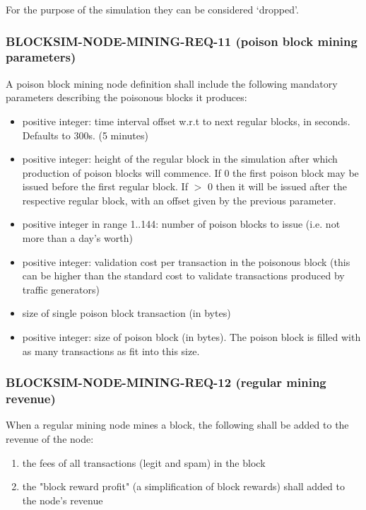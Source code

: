 \documentclass{scrreprt}
\begin{document}
        For the purpose of the simulation they can be considered `dropped'.

      \subsubsection{BLOCKSIM-NODE-MINING-REQ-11 (poison block mining parameters)}

        A poison block mining node definition shall include the following
        mandatory parameters describing the poisonous blocks it produces:

        \begin{itemize}
          \item positive integer: time interval offset w.r.t to next regular
            blocks, in seconds.  Defaults to 300s.  (5 minutes)
          \item positive integer: height of the regular block in the simulation
            after which production of poison blocks will commence.
            If 0 the first poison block may be issued before the first regular block.
            If $>$ 0 then it will be issued after the respective regular block, with an offset
            given by the previous parameter.
          \item positive integer in range 1..144: number of poison blocks to
            issue (i.e. not more than a day's worth)
          \item positive integer: validation cost per transaction in the
            poisonous block (this can be higher than the standard cost to validate
            transactions produced by traffic generators)
          \item size of single poison block transaction (in bytes)
          \item positive integer: size of poison block (in bytes).
            The poison block is filled with as many transactions as fit into
            this size.
        \end{itemize}

      \subsubsection{BLOCKSIM-NODE-MINING-REQ-12 (regular mining revenue)}

        When a regular mining node mines a block, the following shall be
        added to the revenue of the node:

        \begin{enumerate}
          \item the fees of all transactions (legit and spam) in the block
          \item the "block reward profit" (a simplification of
            block rewards) shall added to the node's revenue
        \end{enumerate}
\end{document}
